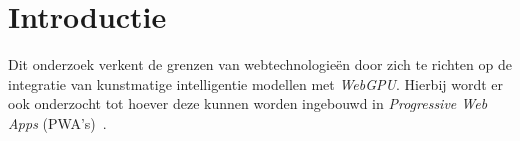 
\section{Introductie}%
\label{sec:introductie}







Dit onderzoek verkent de grenzen van webtechnologieën door zich te richten op de integratie van kunstmatige intelligentie modellen met \textit{WebGPU}. Hierbij wordt er ook onderzocht tot hoever deze kunnen worden ingebouwd in \textit{Progressive Web Apps} (PWA's)~\autocite{Shumylo2023a}. 


